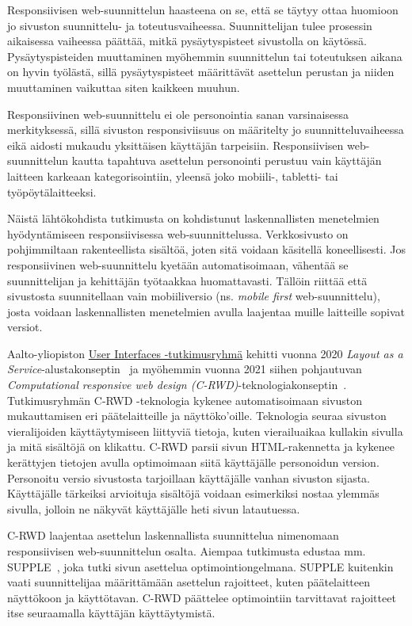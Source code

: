 \documentclass[finnish, 12pt, a4paper, elec, utf8, a-1b, online]{aaltothesis}
\begin{document}
Responsiivisen web-suunnittelun haasteena on se, että se täytyy ottaa huomioon
jo sivuston suunnittelu- ja toteutusvaiheessa. Suunnittelijan tulee prosessin
aikaisessa vaiheessa päättää, mitkä pysäytyspisteet sivustolla on käytössä.
Pysäytyspisteiden muuttaminen myöhemmin suunnittelun tai toteutuksen aikana on
hyvin työlästä, sillä pysäytyspisteet määrittävät asettelun perustan ja niiden
muuttaminen vaikuttaa siten kaikkeen muuhun.

Responsiivinen web-suunnittelu ei ole personointia sanan varsinaisessa
merkityksessä, sillä sivuston responsiviisuus on määritelty jo
suunnitteluvaiheessa eikä aidosti mukaudu yksittäisen käyttäjän tarpeisiin.
Responsiivisen web-suunnittelun kautta tapahtuva asettelun personointi perustuu
vain käyttäjän laitteen karkeaan kategorisointiin, yleensä joko mobiili-,
tabletti- tai työpöytälaitteeksi.

Näistä lähtökohdista tutkimusta on kohdistunut laskennallisten menetelmien
hyödyntämiseen responsiivisessa web-suunnittelussa. Verkkosivusto on
pohjimmiltaan rakenteellista sisältöä, joten sitä voidaan käsitellä
koneellisesti. Jos responsiivinen web-suunnittelu kyetään automatisoimaan,
vähentää se suunnittelijan ja kehittäjän työtaakkaa huomattavasti. Tällöin
riittää että sivustosta suunnitellaan vain mobiiliversio (ns. \textit{mobile
first} web-suunnittelu), josta voidaan laskennallisten menetelmien avulla
laajentaa muille laitteille sopivat versiot.

Aalto-yliopiston \href{https://userinterfaces.aalto.fi/}{User Interfaces
-tutkimusryhmä} kehitti vuonna 2020 \textit{Layout as a
Service}-alustakonseptin~\cite{laine2020_laas} ja myöhemmin vuonna 2021 siihen
pohjautuvan \textit{Computational responsive web design
(C-RWD)}-teknologiakonseptin~\cite{laine2021responsive}. Tutkimusryhmän C-RWD
-teknologia kykenee automatisoimaan sivuston mukauttamisen eri päätelaitteille
ja näyttöko'oille. Teknologia seuraa sivuston vieralijoiden käyttäytymiseen
liittyviä tietoja, kuten vierailuaikaa kullakin sivulla ja mitä sisältöjä on
klikattu. C-RWD parsii sivun HTML-rakennetta ja kykenee kerättyjen tietojen
avulla optimoimaan siitä käyttäjälle personoidun version. Personoitu versio
sivustosta tarjoillaan käyttäjälle vanhan sivuston sijasta. Käyttäjälle
tärkeiksi arvioituja sisältöjä voidaan esimerkiksi nostaa ylemmäs sivulla,
jolloin ne näkyvät käyttäjälle heti sivun latautuessa.

C-RWD laajentaa asettelun laskennallista suunnittelua nimenomaan responsiivisen
web-suunnittelun osalta. Aiempaa tutkimusta edustaa mm.
SUPPLE~\cite{10.1145/964442.964461}, joka tutki sivun asettelua
optimointiongelmana. SUPPLE kuitenkin vaati suunnittelijaa määrittämään
asettelun rajoitteet, kuten päätelaitteen näyttökoon ja käyttötavan. C-RWD
päättelee optimointiin tarvittavat rajoitteet itse seuraamalla käyttäjän
käyttäytymistä.
\end{document}

